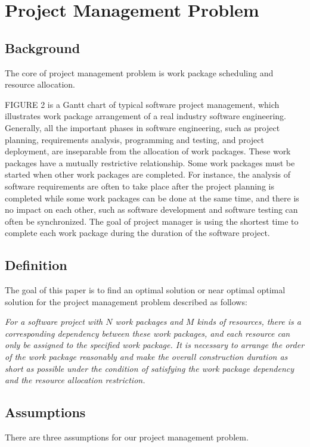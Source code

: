 
\section{Project Management Problem}
%

\subsection{Background}
%

The core of project management problem is work package scheduling and resource
allocation.


FIGURE 2 is a Gantt chart of typical software project management, which
illustrates work package arrangement of a real industry software engineering.
Generally, all the important phases in software engineering, such as project
planning, requirements analysis, programming and testing, and project
deployment, are inseparable from the allocation of work packages.  These work
packages have a mutually restrictive relationship. Some work packages must be
started when other work packages are completed. For instance, the analysis of
software requirements are often to take place after the project planning is
completed while some work packages can be done at the same time, and there is no
impact on each other, such as software development and software testing can
often be synchronized.  The goal of project manager is using the shortest time
to complete each work package during the duration of the software project.


\subsection{Definition}
%
The goal of this paper is to find an optimal solution or near optimal optimal
solution for the project management problem described as follows:


\emph{
  For a software project with $N$ work packages and $M$ kinds of resources,
  there is a corresponding dependency between these work packages, and each
  resource can only be assigned to the specified work package.  It is necessary
  to arrange the order of the work package reasonably and make the overall
  construction duration as short as possible under the condition of satisfying
  the work package dependency and the resource allocation restriction.
}


\subsection{Assumptions}
%
There are three assumptions for our project management problem.


